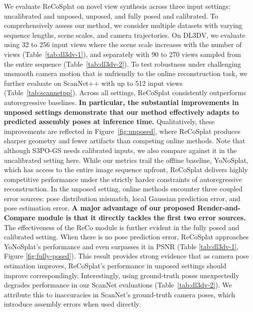 \documentclass[runningheads]{llncs}
\begin{document}
\begin{table}[tb]
{\begin{tabular}{@{} lccc 
        p{0.5em}
        *{3}{c} p{0.5em}
        *{3}{c} p{0.5em}
        *{3}{c} p{0.5em}
        *{3}{c} @{}}
        \bottomrule
    \end{tabular}
}
\end{table}

We evaluate ReCoSplat on novel view synthesis across three input settings: uncalibrated and unposed, unposed, and fully posed and calibrated. 
To comprehensively assess our method, we consider multiple datasets with varying sequence lengths, scene scales, and camera trajectories. 
On DL3DV, we evaluate using 32 to 256 input views where the scene scale increases with the number of views (Table~\ref{tab:dl3dv-1}), and separately with 90 to 270 views sampled from the entire sequence (Table~\ref{tab:dl3dv-2}). 
To test robustness under challenging unsmooth camera motion that is unfriendly to the online reconstruction task, we further evaluate on ScanNet++ with up to 512 input views (Table~\ref{tab:scannetpp}). 
Across all settings, ReCoSplat consistently outperforms autoregressive baselines. 
\textbf{In particular, the substantial improvements in unposed settings demonstrate that our method effectively adapts to predicted assembly poses at inference time.} 
Qualitatively, these improvements are reflected in Figure~\ref{fig:unposed}, where ReCoSplat produces sharper geometry and fewer artifacts than competing online methods.
Note that although S3PO-GS needs calibrated inputs, we also compare against it in the uncalibrated setting here.
While our metrics trail the offline baseline, YoNoSplat, which has access to the entire image sequence upfront, ReCoSplat delivers highly competitive performance under the strictly harder constraints of autoregressive reconstruction.
In the unposed setting, online methods encounter three coupled error sources: pose distribution mismatch, local Gaussian prediction error, and pose estimation error.
\textbf{A major advantage of our proposed Render-and-Compare module is that it directly tackles the first two error sources.}
The effectiveness of the ReCo module is further evident in the fully posed and calibrated setting.
When there is no pose prediction error, ReCoSplat approaches YoNoSplat’s performance and even surpasses it in PSNR (Table \ref{tab:dl3dv-1}, Figure \ref{fig:fully-posed}).
This result provides strong evidence that as camera pose estimation improves, ReCoSplat's performance in unposed settings should improve correspondingly.
Interestingly, using ground-truth poses unexpectedly degrades performance in our ScanNet evaluations (Table~\ref{tab:dl3dv-2}). 
We attribute this to inaccuracies in ScanNet's ground-truth camera poses, which introduce assembly errors when used directly.
\end{document}
